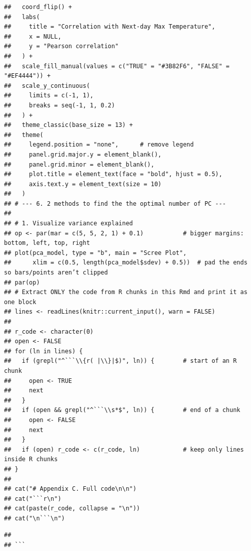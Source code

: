 \documentclass[
]{article}
\begin{document}
\begin{verbatim}
##   coord_flip() +
##   labs(
##     title = "Correlation with Next-day Max Temperature",
##     x = NULL,
##     y = "Pearson correlation"
##   ) +
##   scale_fill_manual(values = c("TRUE" = "#3B82F6", "FALSE" = "#EF4444")) +
##   scale_y_continuous(
##     limits = c(-1, 1),
##     breaks = seq(-1, 1, 0.2)
##   ) +
##   theme_classic(base_size = 13) +
##   theme(
##     legend.position = "none",      # remove legend
##     panel.grid.major.y = element_blank(),
##     panel.grid.minor = element_blank(),
##     plot.title = element_text(face = "bold", hjust = 0.5),
##     axis.text.y = element_text(size = 10)
##   )
## # --- 6. 2 methods to find the the optimal number of PC ---
## 
## # 1. Visualize variance explained 
## op <- par(mar = c(5, 5, 2, 1) + 0.1)           # bigger margins: bottom, left, top, right
## plot(pca_model, type = "b", main = "Scree Plot",
##      xlim = c(0.5, length(pca_model$sdev) + 0.5))  # pad the ends so bars/points aren’t clipped
## par(op)
## # Extract ONLY the code from R chunks in this Rmd and print it as one block
## lines <- readLines(knitr::current_input(), warn = FALSE)
## 
## r_code <- character(0)
## open <- FALSE
## for (ln in lines) {
##   if (grepl("^```\\{r( |\\}|$)", ln)) {        # start of an R chunk
##     open <- TRUE
##     next
##   }
##   if (open && grepl("^```\\s*$", ln)) {        # end of a chunk
##     open <- FALSE
##     next
##   }
##   if (open) r_code <- c(r_code, ln)            # keep only lines inside R chunks
## }
## 
## cat("# Appendix C. Full code\n\n")
## cat("```r\n")
## cat(paste(r_code, collapse = "\n"))
## cat("\n```\n")
\end{verbatim}

\begin{verbatim}
## 
## ```
\end{verbatim}
\end{document}
